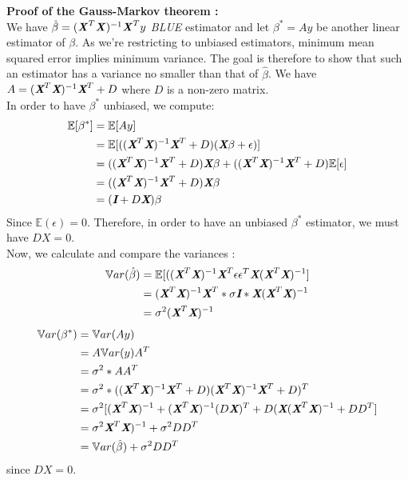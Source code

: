 \documentclass[a4paper,12pt]{article}
\begin{document}
\textbf{Proof of the Gauss-Markov theorem :}
\\ We have \(\hat{\beta} = (\textbf{\textit{X}}^T\textbf{\textit{X}})^{-1} \textbf{\textit{X}}^T y\) \textit{BLUE} estimator and let \(\beta^* = A y\) be another linear estimator of \(\beta\). As we're restricting to unbiased estimators, minimum mean squared error implies minimum variance. The goal is therefore to show that such an estimator has a variance no smaller than that of \(\hat{\beta}\).
We have \(A = (\textit{\textbf{X}}^T \textit{\textbf{X}})^{-1} \textit{\textbf{X}}^T + D\) where \(D\) is a non-zero matrix.
\\ In order to have \(\beta^*\) unbiased, we compute:
\begin{align*}
\mathbb{E}[\beta^*] &= \mathbb{E}[Ay] \\  &= \mathbb{E}[((\textit{\textbf{X}}^T \textit{\textbf{X}})^{-1} \textit{\textbf{X}}^T + D)(\textit{\textbf{X}}\beta + \epsilon)] \\
& = ((\textit{\textbf{X}}^T \textit{\textbf{X}})^{-1} \textit{\textbf{X}}^T + D)\textit{\textbf{X}}\beta + ((\textit{\textbf{X}}^T \textit{\textbf{X}})^{-1} \textit{\textbf{X}}^T + D)\mathbb{E}[\epsilon] \\ &= ((\textit{\textbf{X}}^T \textit{\textbf{X}})^{-1} \textit{\textbf{X}}^T + D)\textit{\textbf{X}}\beta \\ &=  (\textit{\textbf{I}} + D\textit{\textbf{X}})\beta
\end{align*}Since \(\mathbb{E}(\epsilon) = 0\). Therefore, in order to have an unbiased  \(\beta^*\) estimator, we must have \(DX = 0\). \\
Now, we calculate and compare the variances :
\begin{align*}
\mathbb{V}ar(\hat{\beta}) &= \mathbb{E}[((\textit{\textbf{X}}^T \textit{\textbf{X}})^{-1} \textit{\textbf{X}}^T \epsilon \epsilon^T \textit{\textbf{X}} (\textit{\textbf{X}}^T \textit{\textbf{X}})^{-1}] \\  &= (\textit{\textbf{X}}^T \textit{\textbf{X}})^{-1} \textit{\textbf{X}}^T * \sigma \textit{\textbf{I}} * \textit{\textbf{X}} (\textit{\textbf{X}}^T \textit{\textbf{X}})^{-1} \\
& = \sigma^2 (\textit{\textbf{X}}^T \textit{\textbf{X}})^{-1}
\end{align*}
\begin{align*}
\mathbb{V}ar(\beta^*) &= \mathbb{V}ar(Ay)  \\  &= A\mathbb{V}ar(y)A^T \\
& = \sigma^2*AA^T \\ &= \sigma^2*((\textit{\textbf{X}}^T \textit{\textbf{X}})^{-1} \textit{\textbf{X}}^T + D)(\textit{\textbf{X}}^T \textit{\textbf{X}})^{-1} \textit{\textbf{X}}^T + D)^T \\ &= \sigma^2[(\textit{\textbf{X}}^T\textit{\textbf{X}})^{-1} + (\textit{\textbf{X}}^T\textit{\textbf{X}})^{-1}(D\textit{\textbf{X}})^T + D(\textit{\textbf{X}}(\textit{\textbf{X}}^T\textit{\textbf{X}})^{-1} + DD^T] \\ &= \sigma^2\textit{\textbf{X}}^T\textit{\textbf{X}})^{-1} + \sigma^2 DD^T \\ &= \mathbb{V}ar(\hat{\beta}) + \sigma^2 DD^T
\end{align*}since \(DX = 0\). \\
\end{document}
